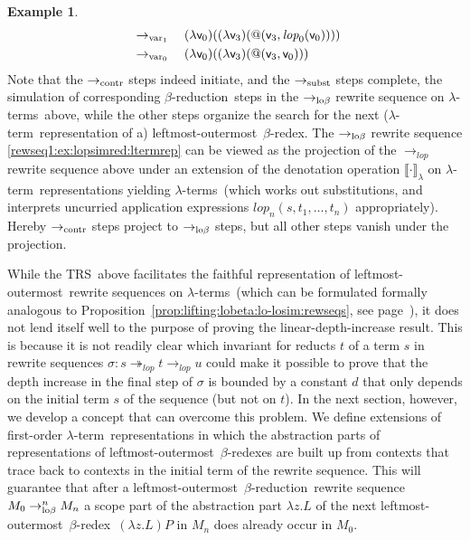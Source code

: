 \documentclass[
submission
]{dmtcs-episciences-tampered}
\makeatletter
\newcommand{\funin}{\mathrel{:}}
\newcommand{\fap}[2]{#1({#2})}
\newcommand{\bfap}[3]{{#1}({#2},\hspace*{0.05pt}{#3})}
\newcommand{\indap}[2]{#1 _{#2}}
\newcommand{\subap}[2]{#1 _{#2}}
\newcommand{\supap}[2]{#1 ^{#2}}
\newcommand{\pap}{\supap}
\newcommand{\bpap}[3]{#1 _{#2}^{#3}}
\newcommand{\nb}{\nobreakdash}
\newcommand{\nf}{\normalfont}
\newcommand{\cvar}{z}
\newcommand{\ater}{s}
\newcommand{\bter}{t}
\newcommand{\cter}{u}
\newcommand{\bteri}{\indap{\bter}}
\newcommand{\TRS}{TRS}
\newcommand{\sfolapp}{@}
\newcommand{\sfolabs}[1]{(\lambda{#1})}
\newcommand{\folapp}{\bfap{\sfolapp}}
\newcommand{\folabs}[1]{\fap{\sfolabs{#1}}}
\newcommand{\afovar}{\mathsf{v}}
\newcommand{\afovari}[1]{\indap{\afovar}{\hspace*{-0.25pt}#1}}
\newcommand{\slop}{\textit{lop}}\newcommand{\slopstar}{\pap{\slop}{*}}
\newcommand{\slopn}{\subap{\slop}}
\newcommand{\lopn}[1]{\fap{\slopn{#1}}}
\newcommand{\denlter}[1]{\llbracket{#1}\rrbracket_{\sslabs}}
\newcommand{\alter}{M}
\newcommand{\clter}{L}
\newcommand{\dlter}{P}
\newcommand{\alteri}{\indap{\alter}}
\newcommand{\sslabs}{\lambda}
\newcommand{\slabs}[1]{\sslabs{#1}.}
\newcommand{\labs}[2]{\slabs{#1}{#2}}
\newcommand{\lapp}[2]{{#1}{#2}}
\newcommand{\sred}{\to}
\newcommand{\sredi}{\indap{\sred}}
\newcommand{\smred}{\twoheadrightarrow}
\newcommand{\smredi}{\indap{\smred}}
\newcommand{\sredin}[2]{\bpap{\sred}{#1}{#2}}
\newcommand{\scriptcontract}{\text{\nf contr}}
\newcommand{\scriptsubst}{\text{\nf subst}}
\newcommand{\scriptvar}{\text{\nf var}}
\newcommand{\ssubstred}{\sredi{\scriptsubst}}
\newcommand{\scontractred}{\sredi{\scriptcontract}}
\newcommand{\scriptlobeta}{\text{\nf lo}\beta}
\newcommand{\slobetared}{\sredi{\scriptlobeta}}
\newcommand{\slobetaredn}{\sredin{\scriptlobeta}}
\newcommand{\lobetaredn}[1]{\mathrel{\slobetaredn{#1}}}
\newcommand{\slopsimred}{\sredi{\slop}}
\newcommand{\lopsimred}{\mathrel{\slopsimred}}
\newcommand{\slopsimmred}{\smredi{\slop}}
\newcommand{\lopsimmred}{\mathrel{\slopsimmred}}
\newcommand{\svarnred}[1]{\sredi{\scriptvar_{#1}}}
\newcommand{\varnred}[1]{\mathrel{\svarnred{#1}}}
\newcommand{\arewseq}{\sigma}
\newcommand{\lambdaterm}{$\lambda$\nb-term}
\newcommand{\lambdaterms}{\lambdaterm{s}}
\newcommand{\betareduction}{$\beta$\nb-re\-duc\-tion}
\newcommand{\betaredex}{$\beta$\nb-re\-dex}
\newcommand{\lo}{left\-most-outer\-most}
\theoremstyle{plain}
\theoremstyle{definition}
\newtheorem{example}[theorem]{Example}
\makeatother
\begin{document}
\begin{example}
\begin{alignat*}{2}
    & \;\varnred{1}\; & & 
       \folabs{\afovari{0}}
              {\folabs{\afovari{3}}
                      {\folapp{\afovari{3}}{\lopn{0}{\afovari{0}}}}}
    \\
    & \;\varnred{0}\; & & 
       \folabs{\afovari{0}}
              {\folabs{\afovari{3}}
                      {\folapp{\afovari{3}}{\afovari{0}}}}
  \end{alignat*}        
Note that the $\scontractred$ steps indeed initiate, and the $\ssubstred$ steps complete,
  the simulation of corresponding \betareduction\ steps in the $\slobetared$ rewrite sequence on \lambdaterms\ above,
  while the other steps organize the search for the next (\lambdaterm\ representation of a) \lo\ \betaredex.
  The $\slobetared$ rewrite sequence \eqref{rewseq1:ex:lopsimred:ltermrep}
  can be viewed as the projection of the $\lopsimred$ rewrite sequence above
  under an extension of the denotation operation $\denlter{\cdot}$ on \lambdaterm\ representations yielding \lambdaterms\
  (which works out substitutions, and interprets uncurried application expressions $\lopn{n}{\ater,\bteri{1},\ldots,\bteri{n}}$ appropriately).
  Hereby $\scontractred$ steps project to $\slobetared$ steps,
  but all other steps vanish under the projection.
\end{example}

While the \TRS\ above facilitates the faithful representation of \lo\ rewrite sequences on \lambdaterms\
(which can be formulated formally analogous to Proposition~\ref{prop:lifting:lobeta:lo-losim:rewseqs}, see page~\pageref{lem:lifting}),
it does not lend itself well to the purpose of proving the linear-depth-increase result.
This is because it is not readily clear which invariant for reducts $\bter$ of a term $\ater$ 
in rewrite sequences $\arewseq \funin \ater \lopsimmred \bter \lopsimred \cter$
could make it possible to prove that the depth increase in the final step of $\arewseq$ is bounded by a constant $d$ that only depends on the initial term $\ater$ of the sequence (but not on $\bter$).
In the next section, however, we develop a concept that can overcome this problem.
We define extensions of first-order \lambdaterm\ representations
in which the abstraction parts of representations of \lo\ \betaredex{es} 
are built up from contexts that trace back to contexts in the initial term of the rewrite sequence.
This will guarantee that after a \lo\ \betareduction\ rewrite sequence $\alteri{0} \lobetaredn{n} \alteri{n}$
a scope part of the abstraction part $\labs{\cvar}{\clter}$ of the next \lo\ \betaredex\ $\lapp{(\labs{\cvar}{\clter})}{\dlter}$ in $\alteri{n}$ 
does already occur in $\alteri{0}$. 
\end{document}
